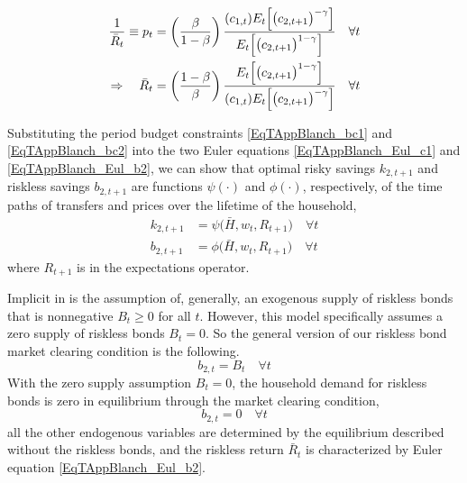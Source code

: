 \documentclass[letterpaper,12pt]{article}
\theoremstyle{definition}
\begin{document}
    \begin{equation}\label{EqTAppBlanch_Eul_b2}
      \begin{split}
        \frac{1}{\bar{R}_t} \equiv p_t = \left(\frac{\beta}{1-\beta}\right)\frac{(c_{1,t})E_t\Bigl[\bigl(c_{2,t+1}\bigr)^{-\gamma}\Bigr]}{E_t\Bigl[\bigl(c_{2,t+1}\bigr)^{1-\gamma}\Bigr]} \quad \forall t \\
        \Rightarrow\quad \bar{R}_t = \left(\frac{1-\beta}{\beta}\right)\frac{E_t\Bigl[\bigl(c_{2,t+1}\bigr)^{1-\gamma}\Bigr]}{(c_{1,t})E_t\Bigl[\bigl(c_{2,t+1}\bigr)^{-\gamma}\Bigr]}\quad\forall t
      \end{split}
    \end{equation}

    Substituting the period budget constraints \eqref{EqTAppBlanch_bc1} and \eqref{EqTAppBlanch_bc2} into the two Euler equations \eqref{EqTAppBlanch_Eul_c1} and \eqref{EqTAppBlanch_Eul_b2}, we can show that optimal risky savings $k_{2,t+1}$ and riskless savings $b_{2,t+1}$ are functions $\psi(\cdot)$ and $\phi(\cdot)$, respectively, of the time paths of transfers and prices over the lifetime of the household,
    \begin{align}
      k_{2,t+1} &= \psi\bigl(\bar{H}, w_t, R_{t+1}\bigr) \quad\forall t \label{EqTAppBlanch_psi} \\
      b_{2,t+1} &= \phi\bigl(\bar{H}, w_t, R_{t+1}\bigr) \quad\forall t \label{EqTAppBlanch_phi}
    \end{align}
    where $R_{t+1}$ is in the expectations operator.

    Implicit in \citet{Blanchard:2019} is the assumption of, generally, an exogenous supply of riskless bonds that is nonnegative $B_t\geq 0$ for all $t$. However, this model specifically assumes a zero supply of riskless bonds $B_t=0$. So the general version of our riskless bond market clearing condition is the following.
    \begin{equation}\label{EqModelMC_B_gen}
      b_{2,t} = B_t \quad\forall t
    \end{equation}
    With the zero supply assumption $B_t = 0$, the household demand for riskless bonds is zero in equilibrium through the market clearing condition,
    \begin{equation}\label{EqModelMC_B_zero}
      b_{2,t} = 0 \quad\forall t
    \end{equation}
    all the other endogenous variables are determined by the equilibrium described without the riskless bonds, and the riskless return $\bar{R}_t$ is characterized by Euler equation \eqref{EqTAppBlanch_Eul_b2}.
\end{document}
